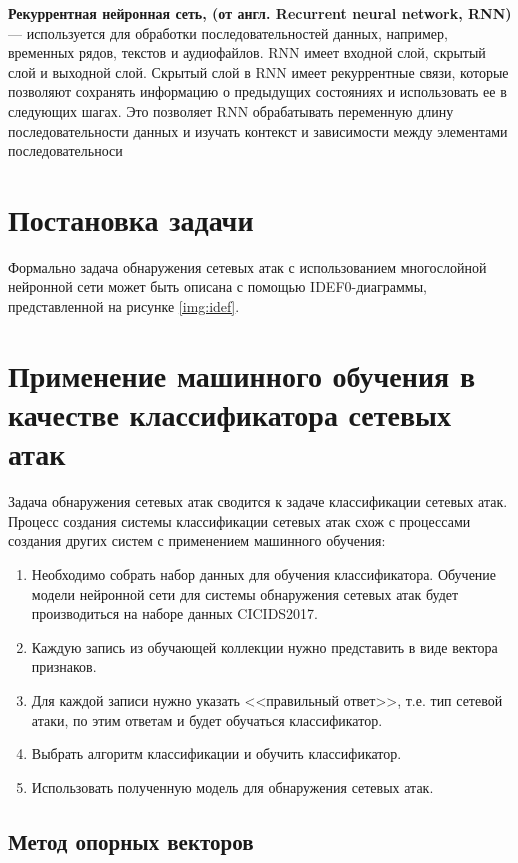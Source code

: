 \textbf{Рекуррентная нейронная сеть, (от англ. Recurrent neural network, RNN)} --- используется для обработки последовательностей данных, например, временных рядов, текстов и аудиофайлов. 
RNN имеет входной слой, скрытый слой и выходной слой. Скрытый слой в RNN имеет рекуррентные связи, которые позволяют сохранять информацию о предыдущих состояниях и использовать ее в следующих шагах.
Это позволяет RNN обрабатывать переменную длину последовательности данных и изучать контекст и зависимости между элементами последовательноси

\section{Постановка задачи}
Формально задача обнаружения сетевых атак с использованием многослойной нейронной сети может быть описана с помощью IDEF0-диаграммы, представленной на рисунке \ref*{img:idef}.


\section{Применение машинного обучения в качестве классификатора сетевых атак}
Задача обнаружения сетевых атак сводится к задаче классификации сетевых атак. Процесс создания системы классификации сетевых атак схож с процессами создания других систем с применением машинного обучения:

\begin{enumerate}
    \item Необходимо собрать набор данных для обучения классификатора. Обучение модели нейронной сети для системы обнаружения сетевых атак будет производиться на наборе данных CICIDS2017.
    \item Каждую запись из обучающей коллекции нужно представить в виде вектора признаков.
    \item Для каждой записи нужно указать <<правильный ответ>>, т.е. тип сетевой атаки, по этим ответам и будет обучаться классификатор.
    \item Выбрать алгоритм классификации и обучить классификатор.
    \item Использовать полученную модель для обнаружения сетевых атак.
\end{enumerate}



\subsection{Метод опорных векторов}

